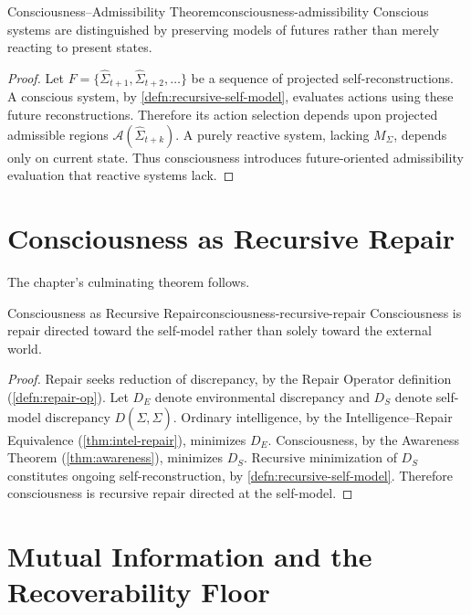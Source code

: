 \documentclass[12pt,twoside,openright]{book}
\newcommand{\adm}{\mathcal{A}}
\begin{document}
\begin{theorem}{Consciousness--Admissibility Theorem}{consciousness-admissibility}
  Conscious systems are distinguished by preserving models
  of futures rather than merely reacting to present
  states.
\end{theorem}

\begin{proof}
  Let $F = \{\hat{\Sigma}_{t+1}, \hat{\Sigma}_{t+2}, \ldots\}$
  be a sequence of projected self-reconstructions. A
  conscious system, by \cref{defn:recursive-self-model},
  evaluates actions using these future reconstructions.
  Therefore its action selection depends upon projected
  admissible regions $\adm(\hat{\Sigma}_{t+k})$. A purely
  reactive system, lacking $M_\Sigma$, depends only on
  current state. Thus consciousness introduces
  future-oriented admissibility evaluation that reactive
  systems lack.
\end{proof}

\section{Consciousness as Recursive Repair}
\label{sec:ch21-recursive-repair}

The chapter's culminating theorem follows.

\begin{theorem}{Consciousness as Recursive Repair}{consciousness-recursive-repair}
  Consciousness is repair directed toward the self-model
  rather than solely toward the external world.
\end{theorem}

\begin{proof}
  Repair seeks reduction of discrepancy, by the Repair
  Operator definition (\cref{defn:repair-op}). Let $D_E$
  denote environmental discrepancy and $D_S$ denote
  self-model discrepancy $D(\Sigma, \hat{\Sigma})$. Ordinary
  intelligence, by the Intelligence--Repair Equivalence
  (\cref{thm:intel-repair}), minimizes $D_E$. Consciousness,
  by the Awareness Theorem (\cref{thm:awareness}), minimizes
  $D_S$. Recursive minimization of $D_S$ constitutes
  ongoing self-reconstruction, by
  \cref{defn:recursive-self-model}. Therefore consciousness
  is recursive repair directed at the self-model.
\end{proof}

\section{Mutual Information and the Recoverability Floor}
\label{sec:ch21-mutual-info}
\end{document}
